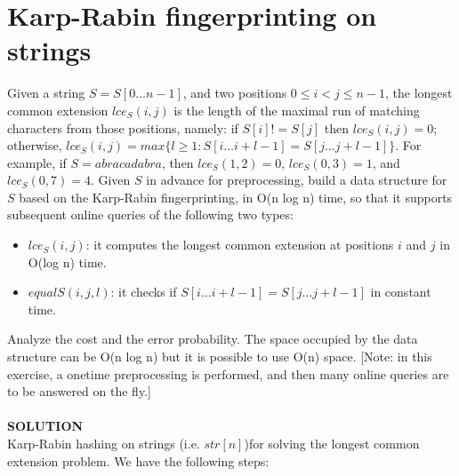 \documentclass[a4paper]{article}
\begin{document}
\section*{Karp-Rabin fingerprinting on strings}
Given a string $S = S[0 \dots n − 1]$, and two positions $0 \leq i < j \leq n − 1$, the longest common extension $lce_S(i, j)$ is the length of the maximal run of matching characters from those positions, namely: if $S[i] != S[j]$ then $lce_S(i, j) = 0$; otherwise, $lce_S(i, j) =  max \{ \textit{l}\geq 1 : S[i \dots i + \textit{l} − 1] = S[j \dots j + \textit{l} − 1] \}$. For example, if $S = abracadabra$, then $lce_S(1, 2) = 0$, $lce_S(0, 3) = 1$, and $lce_S(0, 7) = 4$. Given $S$ in advance for preprocessing, build a data structure for $S$ based on the Karp-Rabin fingerprinting, in O(n log n) time, so that it supports subsequent online queries of the following two types:
\begin{itemize}
\item $lce_S(i, j)$: it computes the longest common extension at positions $i$ and $j$ in O(log n) time.
\item $equalS(i, j,\textit{l})$: it checks if $S[i \dots i + \textit{l} − 1] = S[j \dots j + \textit{l} − 1]$ in constant time.
\end{itemize}
Analyze the cost and the error probability. The space occupied by the data structure can be O(n log n) but it is possible to use O(n) space. [Note: in this exercise, a onetime preprocessing is performed, and then many online queries are to be answered on the fly.]\\
\\
\textbf{SOLUTION}
\\
Karp-Rabin hashing on strings (i.e. $str[n]$)for solving the longest common extension problem. We have the following steps:
\end{document}
